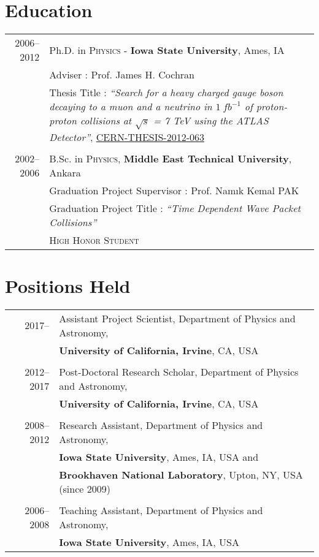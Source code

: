 \documentclass[a4paper,10pt]{article}
\begin{document}
\vspace{3mm}
\section{Education}

\begin{tabular}{r | p{15.5cm}}
\textsc{2006--2012}				&  Ph.D. in \textsc{Physics} - \textbf{Iowa State University}, Ames, IA \\ 
							& Adviser\phantom{Ttle} : Prof. James H. Cochran \\
							& Thesis Title : {\it``Search for a heavy charged gauge boson decaying to a 
							    muon and a neutrino in $1\ fb^{-1}$ of proton-proton collisions 
							    at $\sqrt{s}$ = 7 TeV using the ATLAS Detector''}, \href{http://cds.cern.ch/record/1454661}{CERN-THESIS-2012-063} \\	
\multicolumn{2}{c}{} \\
\textsc{2002--2006} 				& B.Sc. in \textsc{Physics}, \textbf{Middle East Technical University}, Ankara	\\
							& Graduation Project Supervisor : Prof. Nam{\i}k Kemal \textsc{PAK}					\\
							& Graduation Project Title \phantom{rvsor} : \it{``Time Dependent Wave Packet Collisions''} 	\\
							& \normalsize \textsc{High Honor Student}										\\
\end{tabular}

\vspace{3mm}
\section{Positions Held}
\begin{tabular}{r|p{15.5cm}}
\textsc{2017--\phantom{0000}}		&		Assistant Project Scientist, Department of Physics and Astronomy, 	\\
							&		{\bf University of California, Irvine}, CA, USA  						\\
\multicolumn{2}{c}{} \\
\textsc{2012--2017}		&		Post-Doctoral Research Scholar, Department of Physics and Astronomy, 	\\
							&		{\bf University of California, Irvine}, CA, USA  						\\
\multicolumn{2}{c}{} \\
\textsc{2008--2012}				&		Research Assistant, Department of Physics and Astronomy, 			\\
							&		{\bf Iowa State University}, Ames, IA, USA and 						\\
							& 		{\bf Brookhaven National Laboratory}, Upton, NY, USA (since 2009)		\\
\multicolumn{2}{c}{} \\
\textsc{2006--2008}				&		Teaching Assistant, Department of Physics and Astronomy, 			\\
							&		{\bf Iowa State University}, Ames, IA, USA 						\\
\end{tabular}
\end{document}
